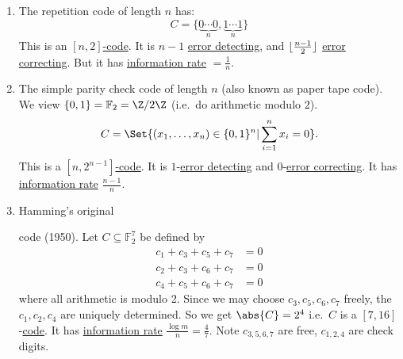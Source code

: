 \documentclass{article}
\DeclarePairedDelimiter{\floor}{\lfloor}{\rfloor}
\newcommand{\1}[1]{\mathbbm{1}_{#1}}
\begin{document}
\begin{eg} \leavevmode
    \begin{enumerate}[label=\arabic*.]
        \item The \hypertarget{def:repetitionCode}{repetition code} of length $n$ has:
            \begin{equation*}
                C = \{\underbrace{0\dotsm0}_n, \underbrace{1 \dotsm1}_n\}
            \end{equation*}
            This is an \hyperlink{def:binaryCode}{$[n, 2]$-code}. It is $n-1$ \hyperlink{def:errorDet}{error detecting}, and $\floor{\frac{n-1}{2}}$ \hyperlink{def:errorCor}{error correcting}.
            But it has \hyperlink{def:infoRate}{information rate} $= \frac{1}{n}$.
        \item The \hypertarget{def:parityCheckCode}{simple parity check} code of length $n$ (also known as paper tape code).
            We view $\{0, 1\} = \mathbb{F}_2 = \Z/2\Z$ (i.e.\ do arithmetic modulo $2$).
            \begin{equation*}
                C = \Set{(x_1, \dotsc, x_n) \in \{0, 1\}^n | \sum_{i=1}^n x_i = 0}.
            \end{equation*}
            This is a \hyperlink{def:binaryCode}{$[n, 2^{n-1}]$-code}.
            It is $1$-\hyperlink{def:errorDet}{error detecting} and $0$-\hyperlink{def:errorCor}{error correcting}.
            It has \hyperlink{def:infoRate}{information rate} $\frac{n-1}{n}$.
        \item \hypertarget{def:hammingCode}{Hamming's original} code (1950). %
            Let $C \subseteq \mathbb{F}_2^7$ be defined by
            \begin{align*}
                c_1 + c_3 + c_5 + c_7 &= 0 \\
                c_2 + c_3 + c_6 + c_7 &= 0 \\
                c_4 + c_5 + c_6 + c_7 &= 0
            \end{align*}
            where all arithmetic is modulo 2.
            Since we may choose $c_3, c_5, c_6, c_7$ freely, the $c_1, c_2, c_4$ are uniquely determined.
            So we get $\abs{C} = 2^4$ i.e.\ $C$ is a $[7,16]$-\hyperlink{def:binaryCode}{code}.
            It has \hyperlink{def:infoRate}{information rate} $\frac{\log m} {n} = \frac{4}{7}$.
            Note $c_{3,5,6,7}$ are free, $c_{1,2,4}$ are check digits.


\end{enumerate}
\end{eg}
\end{document}
